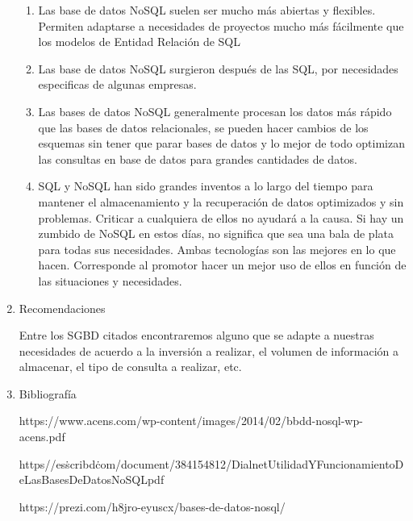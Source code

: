 \documentclass[12pt,a4paper,oneside]{book}
\begin{document}
\begin{enumerate}
		\begin{enumerate}
			\item Las base de datos NoSQL suelen ser mucho más abiertas y flexibles. Permiten adaptarse a necesidades de proyectos mucho más fácilmente que los modelos de Entidad Relación de SQL\\
			
			\item Las base de datos NoSQL surgieron  después de las SQL, por necesidades especificas de algunas empresas.\\
			
			\item Las bases de datos NoSQL generalmente procesan los datos más rápido que las bases de datos relacionales, se pueden hacer cambios de los esquemas sin tener que parar bases de datos y lo mejor de todo optimizan las consultas en base de datos para grandes cantidades de datos.\\
			
			\item SQL y NoSQL han sido grandes inventos a lo largo del tiempo para mantener el almacenamiento y la recuperación de datos optimizados y sin problemas. Criticar a cualquiera de ellos no ayudará a la causa. Si hay un zumbido de NoSQL en estos días, no significa que sea una bala de plata para todas sus necesidades. Ambas tecnologías son las mejores en lo que hacen. Corresponde al promotor hacer un mejor uso de ellos en función de las situaciones y necesidades.\\
			
			
		\end{enumerate}
		\item Recomendaciones
		
		Entre los SGBD citados encontraremos alguno que se adapte a nuestras necesidades de acuerdo a la inversión a realizar, el volumen de información a almacenar, el tipo de consulta a realizar, etc.\\
		
		\item Bibliografía
	
	
	https://www.acens.com/wp-content/images/2014/02/bbdd-nosql-wp-acens.pdf
	
	https\://es\.scribd\.com/document/384154812/Dialnet\-UtilidadYFuncionamientoDeLasBasesDeDatosNoSQL\-pdf 
	
	https://prezi.com/h8jro-eyuscx/bases-de-datos-nosql/ 
	
	
	
	
	
		
	\end{enumerate}
	
	
	
\end{document}

